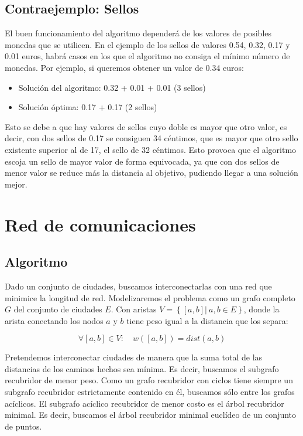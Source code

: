 \documentclass[a4paper, 11pt]{article} %
\begin{document}
  \small
    \texttt{}
  \normalsize

\subsection{Contraejemplo: Sellos} %
El buen funcionamiento del algoritmo dependerá de los valores de posibles monedas que se utilicen. En el ejemplo de los sellos de valores 0.54, 0.32, 0.17 y 0.01 euros, habrá casos en los que el algoritmo no consiga el mínimo número de monedas. Por ejemplo, si queremos obtener un valor de 0.34 euros:
\begin{itemize}
	\item Solución del algoritmo: 0.32 + 0.01 + 0.01 (3 sellos)
	\item Solución óptima: 0.17 + 0.17 (2 sellos)
\end{itemize}

Esto se debe a que hay valores de sellos cuyo doble es mayor que otro valor, es decir, con dos sellos de 0.17 se consiguen 34 céntimos, que es mayor que otro sello existente superior al de 17, el sello de 32 céntimos. Esto provoca que el algoritmo escoja un sello de mayor valor de forma equivocada, ya que con dos sellos de menor valor se reduce más la distancia al objetivo, pudiendo llegar a una solución mejor.
  
\section{Red de comunicaciones}
  \subsection{Algoritmo}
    Dado un conjunto de ciudades, buscamos interconectarlas con una red que minimice la longitud de red. 
    Modelizaremos el problema como un grafo completo $G$ del conjunto de ciudades $E$. Con aristas 
    $V = \left\{ [a,b] |\ a,b \in E \right\}$, donde la arista conectando los nodos $a$ y $b$ tiene peso 
    igual a la distancia que los separa:

    \begin{equation}
     \forall [a,b]\in V:\quad  w([a,b]) = dist (a,b)
    \end{equation}

    Pretendemos interconectar ciudades de manera que la suma total de las distancias de los caminos hechos 
    sea mínima. Es decir, buscamos el subgrafo recubridor de menor peso. Como un grafo recubridor con ciclos 
    tiene siempre un subgrafo recubridor estrictamente contenido en él, buscamos sólo entre los grafos acíclicos.
    El subgrafo acíclico recubridor de menor costo es el árbol recubridor minimal. Es decir, buscamos el árbol
    recubridor minimal euclídeo de un conjunto de puntos.
    
\end{document}
